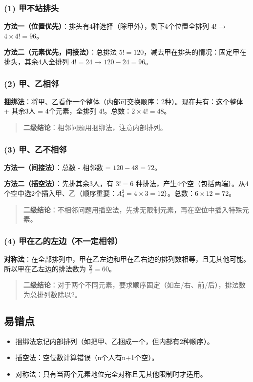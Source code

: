 \documentclass[10pt]{article}
\begin{document}
\subsubsection*{(1) 甲不站排头}
\textbf{方法一（位置优先）}：排头有4种选择（除甲外），剩下4个位置全排列 \(4!\) → \(4 \times 4! = 96\)。

\textbf{方法二（元素优先，间接法）}：总排法 \(5! = 120\)，减去甲在排头的情况：固定甲在排头，其余4人全排列 \(4! = 24\) → \(120-24=96\)。

\subsubsection*{(2) 甲、乙相邻}
\textbf{捆绑法}：将甲、乙看作一个整体（内部可交换顺序：2种）。现在共有：这个整体 + 其余3人 = 4个元素，全排列 \(4!\)。总数：\(2 \times 4! = 48\)。

\begin{quote}
\textbf{二级结论}：相邻问题用捆绑法，注意内部排列。
\end{quote}

\subsubsection*{(3) 甲、乙不相邻}
\textbf{方法一（间接法）}：总数 - 相邻数 = \(120 - 48 = 72\)。

\textbf{方法二（插空法）}：先排其余3人，有 \(3! = 6\) 种排法，产生4个空（包括两端）。从4个空中选2个插入甲、乙（顺序重要：\(A_4^2 = 4\times3=12\)）。总数：\(6 \times 12 = 72\)。

\begin{quote}
\textbf{二级结论}：不相邻问题用插空法，先排无限制元素，再在空位中插入特殊元素。
\end{quote}

\subsubsection*{(4) 甲在乙的左边（不一定相邻）}
\textbf{对称法}：在全部排列中，甲在乙左边和甲在乙右边的排列数相等，且无其他可能。所以甲在乙左边的排法数为 \(\frac{5!}{2} = 60\)。

\begin{quote}
\textbf{二级结论}：对于两个不同元素，要求顺序固定（如左/右、前/后），排法数为总排列数除以2。
\end{quote}

\subsection*{易错点}
\begin{itemize}
\item 捆绑法忘记内部排列（如把甲、乙捆成一个，但内部有2种顺序）。
\item 插空法：空位数计算错误（n个人有n+1个空）。
\item 对称法：只有当两个元素地位完全对称且无其他限制时才适用。
\end{itemize}
\end{document}

